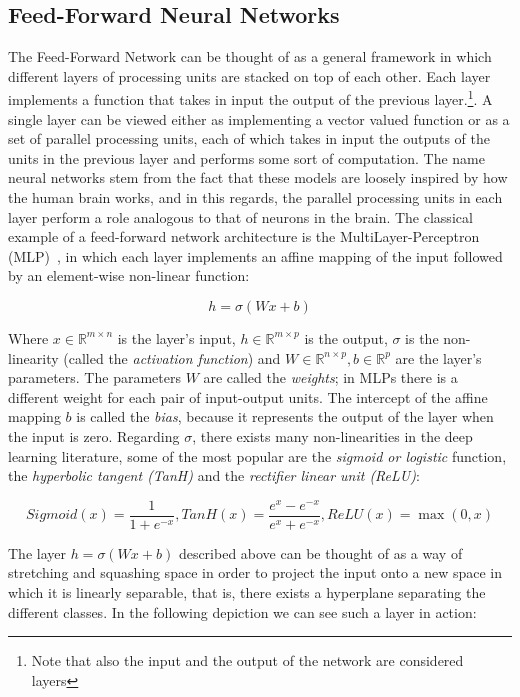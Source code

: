 \documentclass[../main.tex]{subfiles}
\begin{document}
    \subsection{Feed-Forward Neural Networks}
    The Feed-Forward Network can be thought of as a general framework in which different layers of processing units are stacked on top
    of each other. Each layer implements a function that takes in input the output of the previous layer.\footnote{Note that also the input and
    the output of the network are considered layers}. A single layer can be viewed either as implementing a vector valued function or
    as a set of parallel processing units, each of which takes in input the outputs of the units in the previous layer and performs some
    sort of computation. The name neural networks stem from the fact that these models are loosely inspired by how the human brain works,
    and in this regards, the parallel processing units in each layer perform a role analogous to that of neurons in the brain.
    The classical example of a feed-forward network architecture is the MultiLayer-Perceptron (MLP)~\cite{mlp}, in which
    each layer implements an affine mapping of the input followed by an element-wise non-linear function:

    \begin{equation}
        h = \sigma(Wx + b)
    \end{equation}

    Where $x \in \mathbb{R}^{m \times n}$ is the layer's input, $h \in \mathbb{R}^{m \times p}$ is the output,
    $\sigma$ is the non-linearity (called the \textit{activation function}) and
    $W \in \mathbb{R}^{n \times p}, b \in \mathbb{R}^{p}$ are the layer's parameters.
    The parameters $W$ are called the \textit{weights}; in MLPs there is a different weight for each pair of input-output units.
    The intercept of the affine mapping $b$ is called the \textit{bias}, because it represents the output of the layer when
    the input is zero. Regarding $\sigma$, there exists many non-linearities in the deep learning literature, some of the most popular are the
    \textit{sigmoid or logistic} function, the \textit{hyperbolic tangent (TanH)} and the \textit{rectifier linear unit (ReLU)}:

    \begin{equation}
        Sigmoid(x) = \frac{1}{1 + e^{-x}}, TanH(x) = \frac{e^{x} - e^{-x}}{e^{x} + e^{-x}}, ReLU(x) = \max(0, x)
    \end{equation}

    The layer $h = \sigma(Wx + b)$ described above can be thought of as a way of stretching and squashing space in order to project
    the input onto a new space in which it is linearly separable, that is, there exists a hyperplane separating the different classes.
    In the following depiction we can see such a layer in action:
\end{document}
